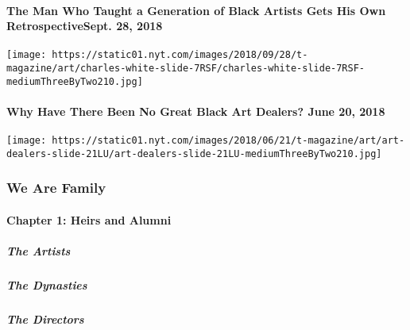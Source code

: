 \hypertarget{the-man-who-taught-a-generation-of-black-artists-gets-his-own-retrospectivesept-28-2018}{%
\paragraph{The Man Who Taught a Generation of Black Artists Gets His Own
RetrospectiveSept. 28,
2018}\label{the-man-who-taught-a-generation-of-black-artists-gets-his-own-retrospectivesept-28-2018}}

\texttt{[image: https://static01.nyt.com/images/2018/09/28/t-magazine/art/charles-white-slide-7RSF/charles-white-slide-7RSF-mediumThreeByTwo210.jpg]}
\href{https://www.nytimes.com/2018/06/20/t-magazine/black-art-dealers.html}{}

\hypertarget{why-have-there-been-no-great-black-art-dealers-june-20-2018}{%
\paragraph{Why Have There Been No Great Black Art Dealers? June 20,
2018}\label{why-have-there-been-no-great-black-art-dealers-june-20-2018}}

\texttt{[image: https://static01.nyt.com/images/2018/06/21/t-magazine/art/art-dealers-slide-21LU/art-dealers-slide-21LU-mediumThreeByTwo210.jpg]}

\hypertarget{we-are-family-1}{%
\subsubsection{We Are Family}\label{we-are-family-1}}

\hypertarget{chapter-1-heirs-and-alumni-1}{%
\paragraph{Chapter 1: Heirs and
Alumni}\label{chapter-1-heirs-and-alumni-1}}

\href{/interactive/2020/04/13/t-magazine/black-art-galleries.html}{}

\hypertarget{the-artists-1}{%
\subparagraph{The Artists}\label{the-artists-1}}

\href{/interactive/2020/04/13/t-magazine/italian-fashion-design-houses.html}{}

\hypertarget{the-dynasties}{%
\subparagraph{The Dynasties}\label{the-dynasties}}

\href{/interactive/2020/04/13/t-magazine/gordon-parks.html}{}

\hypertarget{the-directors}{%
\subparagraph{The Directors}\label{the-directors}}


